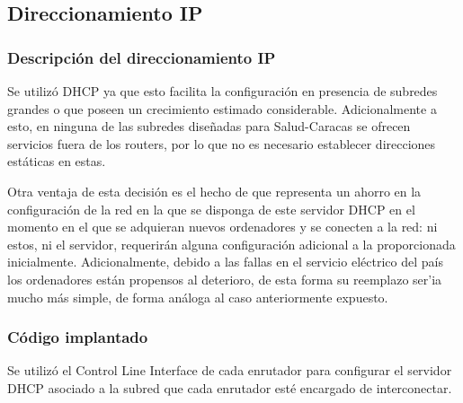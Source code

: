 \documentclass[]{article}
\begin{document}
\subsection{Direccionamiento IP}\label{direccionamiento-ip}

\subsubsection{Descripción del direccionamiento
IP}\label{descripciuxf3n-del-direccionamiento-ip}

Se utilizó DHCP ya que esto facilita la configuración en presencia de
subredes grandes o que poseen un crecimiento estimado considerable.
Adicionalmente a esto, en ninguna de las subredes diseñadas para
Salud-Caracas se ofrecen servicios fuera de los routers, por lo que no
es necesario establecer direcciones estáticas en estas.

Otra ventaja de esta decisión es el hecho de que representa un ahorro en
la configuración de la red en la que se disponga de este servidor DHCP
en el momento en el que se adquieran nuevos ordenadores y se conecten a
la red: ni estos, ni el servidor, requerirán alguna configuración
adicional a la proporcionada inicialmente. Adicionalmente, debido a las
fallas en el servicio eléctrico del país los ordenadores están propensos
al deterioro, de esta forma su reemplazo ser'ia mucho más simple, de
forma análoga al caso anteriormente expuesto.

\subsubsection{Código implantado}\label{cuxf3digo-implantado-1}

Se utilizó el Control Line Interface de cada enrutador para configurar
el servidor DHCP asociado a la subred que cada enrutador esté encargado
de interconectar.
\end{document}
